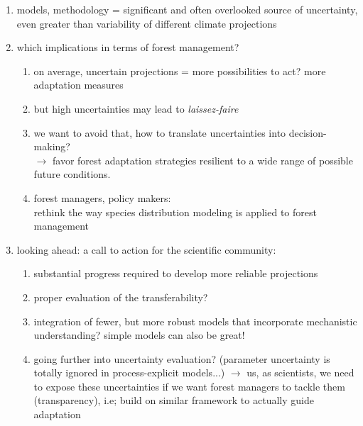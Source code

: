\documentclass[11pt,letter]{article}
\begin{document}
\begin{enumerate}
	
\item models, methodology = significant and often overlooked source of uncertainty, even greater than variability of different climate projections


\item which implications in terms  of forest management? 
\begin{enumerate}
\item on average, uncertain projections = more possibilities to act? more adaptation measures
\item but high uncertainties may lead to \emph{laissez-faire}
\item we want to avoid that, how to translate uncertainties into decision-making?\\
$\rightarrow$ favor forest adaptation strategies resilient to a wide range of possible future conditions.
\item forest managers, policy makers:\\
rethink the way species distribution modeling is applied to forest management\\
\end{enumerate}

\item looking ahead: a call to action for the scientific community:
\begin{enumerate}
	\item substantial progress required to develop more reliable projections
	\item proper evaluation of the transferability?
	\item integration of fewer, but more robust models that incorporate mechanistic understanding? simple models can also be great!
	\item going further into uncertainty evaluation? (parameter uncertainty is totally ignored in process-explicit models...)
	$\rightarrow$ us, as scientists, we need to expose these uncertainties if we want forest managers to tackle them (transparency), i.e; build on similar framework to actually guide adaptation
\end{enumerate}








\end{enumerate}
\end{document}
